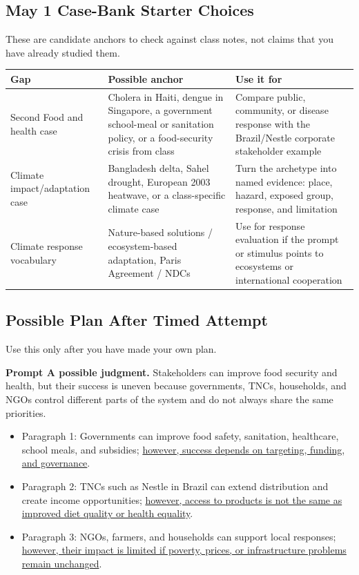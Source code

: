 \documentclass[11pt,a4paper]{article}
\begin{document}
\subsection{May 1 Case-Bank Starter Choices}

These are candidate anchors to check against class notes, not claims that you
have already studied them.

\begin{tabularx}{\textwidth}{L{0.2\textwidth}Y Y}
\toprule
\textbf{Gap} & \textbf{Possible anchor} & \textbf{Use it for} \\
\midrule
Second Food and health case & Cholera in Haiti, dengue in Singapore, a
government school-meal or sanitation policy, or a food-security crisis from
class & Compare public, community, or disease response with the Brazil/Nestle
corporate stakeholder example \\
Climate impact/adaptation case & Bangladesh delta, Sahel drought, European 2003
heatwave, or a class-specific climate case & Turn the archetype into named
evidence: place, hazard, exposed group, response, and limitation \\
Climate response vocabulary & Nature-based solutions / ecosystem-based
adaptation, Paris Agreement / NDCs & Use for response evaluation if the prompt
or stimulus points to ecosystems or international cooperation \\
\bottomrule
\end{tabularx}

\subsection{Possible Plan After Timed Attempt}

Use this only after you have made your own plan.

\noindent\colorbox{SoftTint}{%
\begin{minipage}{0.965\textwidth}
\sffamily
\textbf{\textcolor{HeadingBlue}{Prompt A possible judgment.}}
Stakeholders can improve food security and health, but their success is
uneven because governments, TNCs, households, and NGOs control different parts
of the system and do not always share the same priorities.
\end{minipage}
}

\begin{itemize}
  \item Paragraph 1: Governments can improve food safety, sanitation,
  healthcare, school meals, and subsidies; \uline{however, success depends on
  targeting, funding, and governance}.
  \item Paragraph 2: TNCs such as Nestle in Brazil can extend distribution and
  create income opportunities; \uline{however, access to products is not the
  same as improved diet quality or health equality}.
  \item Paragraph 3: NGOs, farmers, and households can support local responses;
  \uline{however, their impact is limited if poverty, prices, or infrastructure
  problems remain unchanged}.
\end{itemize}
\end{document}
